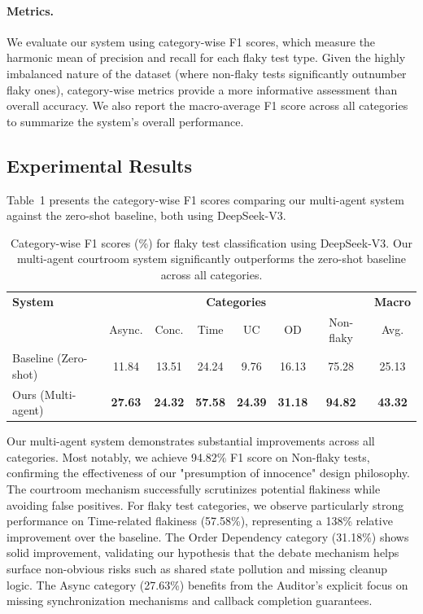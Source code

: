 \documentclass{article}
\begin{document}
\paragraph{Metrics.} We evaluate our system using category-wise F1 scores, which measure the harmonic mean of precision and recall for each flaky test type. Given the highly imbalanced nature of the dataset (where non-flaky tests significantly outnumber flaky ones), category-wise metrics provide a more informative assessment than overall accuracy. We also report the macro-average F1 score across all categories to summarize the system's overall performance.

\subsection{Experimental Results}

Table~1 presents the category-wise F1 scores comparing our multi-agent system against the zero-shot baseline, both using DeepSeek-V3.

\begin{table}[h]
\centering
\begin{tabular}{l|cccccc|c}
\hline
\textbf{System} & \multicolumn{6}{c|}{\textbf{Categories}} & \textbf{Macro} \\
 & Async. & Conc. & Time & UC & OD & Non-flaky & Avg. \\
\hline
Baseline (Zero-shot) & 11.84 & 13.51 & 24.24 & 9.76 & 16.13 & 75.28 & 25.13 \\
Ours (Multi-agent) & \textbf{27.63} & \textbf{24.32} & \textbf{57.58} & \textbf{24.39} & \textbf{31.18} & \textbf{94.82} & \textbf{43.32} \\
\hline
\end{tabular}
\caption{Category-wise F1 scores (\%) for flaky test classification using DeepSeek-V3. Our multi-agent courtroom system significantly outperforms the zero-shot baseline across all categories.}
\end{table}

Our multi-agent system demonstrates substantial improvements across all categories. Most notably, we achieve 94.82\% F1 score on Non-flaky tests, confirming the effectiveness of our "presumption of innocence" design philosophy. The courtroom mechanism successfully scrutinizes potential flakiness while avoiding false positives. For flaky test categories, we observe particularly strong performance on Time-related flakiness (57.58\%), representing a 138\% relative improvement over the baseline. The Order Dependency category (31.18\%) shows solid improvement, validating our hypothesis that the debate mechanism helps surface non-obvious risks such as shared state pollution and missing cleanup logic. The Async category (27.63\%) benefits from the Auditor's explicit focus on missing synchronization mechanisms and callback completion guarantees.
\end{document}

